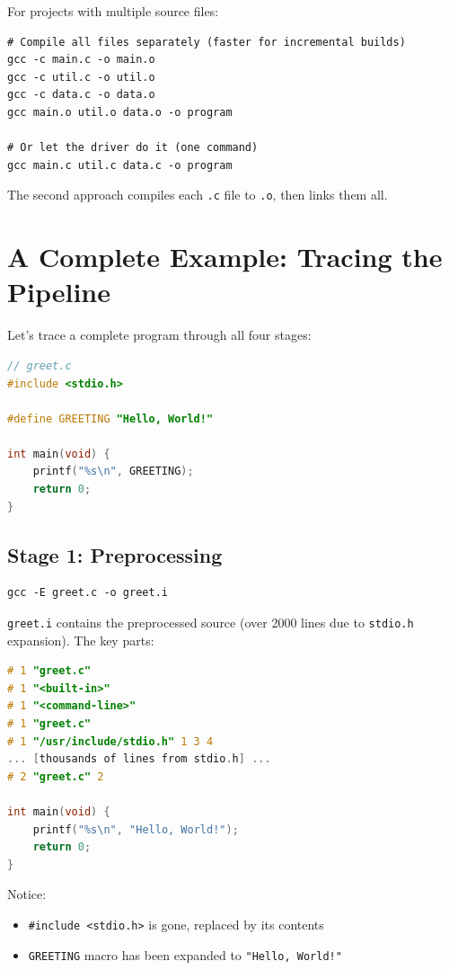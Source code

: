For projects with multiple source files:

\begin{verbatim}
# Compile all files separately (faster for incremental builds)
gcc -c main.c -o main.o
gcc -c util.c -o util.o
gcc -c data.c -o data.o
gcc main.o util.o data.o -o program

# Or let the driver do it (one command)
gcc main.c util.c data.c -o program
\end{verbatim}

The second approach compiles each \texttt{.c} file to \texttt{.o}, then links them all.

\section{A Complete Example: Tracing the Pipeline}

Let's trace a complete program through all four stages:

\begin{lstlisting}[language=C]
// greet.c
#include <stdio.h>

#define GREETING "Hello, World!"

int main(void) {
    printf("%s\n", GREETING);
    return 0;
}
\end{lstlisting}

\subsection{Stage 1: Preprocessing}

\begin{verbatim}
gcc -E greet.c -o greet.i
\end{verbatim}

\texttt{greet.i} contains the preprocessed source (over 2000 lines due to \texttt{stdio.h} expansion). The key parts:

\begin{lstlisting}[language=C]
# 1 "greet.c"
# 1 "<built-in>"
# 1 "<command-line>"
# 1 "greet.c"
# 1 "/usr/include/stdio.h" 1 3 4
... [thousands of lines from stdio.h] ...
# 2 "greet.c" 2

int main(void) {
    printf("%s\n", "Hello, World!");
    return 0;
}
\end{lstlisting}

Notice:
\begin{itemize}
    \item \texttt{\#include <stdio.h>} is gone, replaced by its contents
    \item \texttt{GREETING} macro has been expanded to \texttt{"Hello, World!"}
\end{itemize}

